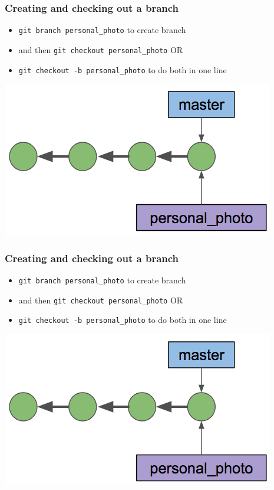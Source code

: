 \documentclass[12pt]{beamer}
\begin{document}
\begin{frame}
\frametitle{Creating and checking out a branch}
\begin{itemize}
	\item \texttt{git branch personal_photo} to create branch
	\item and then \texttt{git checkout personal_photo} OR
	\item \texttt{git checkout -b personal_photo} to do both in one line
\end{itemize}
\begin{center}
	\includegraphics[width=0.6\linewidth]{branch_diagram}
\end{center}
\end{frame}

\begin{frame}
\frametitle{Creating and checking out a branch}
\begin{itemize}
	\item \texttt{git branch personal_photo} to create branch
	\item and then \texttt{git checkout personal_photo} OR
	\item \texttt{git checkout -b personal_photo} to do both in one line
\end{itemize}
\begin{center}
	\includegraphics[width=0.6\linewidth]{branch_diagram}
\end{center}
\end{frame}
\end{document}
